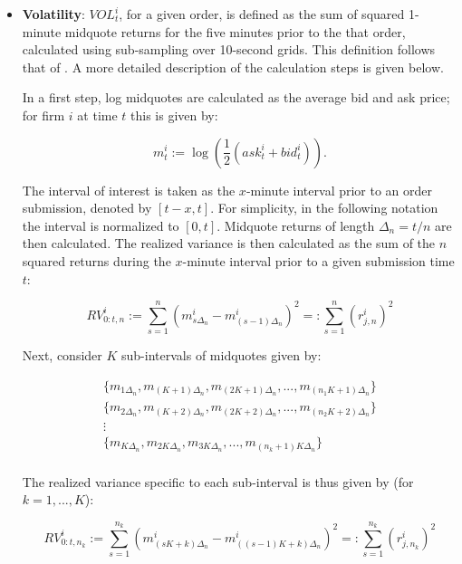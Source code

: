 \documentclass{article}
\begin{document}
\begin{itemize}
\item \textbf{Volatility}: $VOL_{t}^i$, for a given order, is defined as the sum of squared 1-minute midquote returns for the five minutes prior to the that order, calculated using sub-sampling over 10-second grids. This definition follows that of \citet{hautsch2011econometrics}. A more detailed description of the calculation steps is given below.

\noindent In a first step, log midquotes are calculated as the average bid and ask price; for firm $i$ at time $t$ this is given by:

\begin{equation}\label{eq:mid}
m_t^i := \log\left(\frac{1}{2}(ask_t^i + bid_t^i)\right).
\end{equation}

\noindent The interval of interest is taken as the $x$-minute interval prior to an order submission, denoted by $[t-x,t]$. For simplicity, in the following notation the interval is normalized to $[0,t]$. Midquote returns of length $\Delta_n = t/n$ are then calculated. The realized variance is then calculated as the sum of the $n$ squared returns during the $x$-minute interval prior to a given submission time $t$:

\begin{equation*}
RV_{0:t,n}^i := \sum_{s=1}^n (m_{s\Delta_n}^i - m_{(s-1)\Delta_n}^i)^2 =: \sum_{s=1}^n (r_{j,n}^i)^2
\end{equation*}

\noindent Next, consider $K$ sub-intervals of midquotes given by:

\begin{equation*}
\begin{array}{c}
\{m_{1\Delta_n},m_{(K+1)\Delta_n},m_{(2K+1)\Delta_n},...,m_{(n_1K+1)\Delta_n}\} \\
\{m_{2\Delta_n},m_{(K+2)\Delta_n},m_{(2K+2)\Delta_n},...,m_{(n_2K+2)\Delta_n}\} \\
\vdots \\
\{m_{K\Delta_n},m_{2K\Delta_n},m_{3K\Delta_n},...,m_{(n_k+1)K\Delta_n}\} \\
\end{array}
\end{equation*}

\noindent The realized variance specific to each sub-interval is thus given by (for $k=1,...,K$):

\begin{equation*}
RV_{0:t,n_k}^i := \sum_{s=1}^{n_k} (m_{(sK+k)\Delta_n}^i - m_{((s-1)K+k)\Delta_n}^i)^2 =: \sum_{s=1}^{n_k} (r_{j,n_k}^i)^2
\end{equation*}


\end{itemize}
\end{document}

